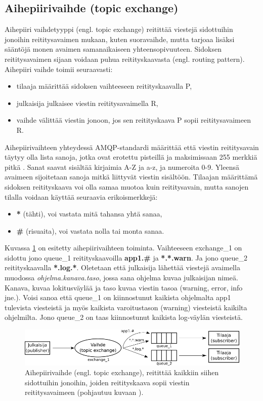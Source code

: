 \subsection{Aihepiirivaihde (topic exchange)}
Aihepiiri vaihdetyyppi (engl. topic exchange) reitittää viestejä sidottuihin jonoihin reititysavaimen mukaan, kuten suoravaihde, mutta tarjoaa lisäksi sääntöjä monen avaimen samanaikaiseen yhteensopivuuteen. Sidoksen reititysavaimen sijaan voidaan puhua reitityskaavasta (engl. routing pattern). Aihepiiri vaihde toimii seuraavasti:
\begin{itemize}
	\item tilaaja määrittää sidoksen vaihteeseen reitityskaavalla P,
	\item julkaisija julkaisee viestin reititysavaimella R,
	\item vaihde välittää viestin jonoon, jos sen reitityskaava P sopii reititysavaimeen R.
\end{itemize}
Aihepiirivaihteen yhteydessä AMQP-standardi määrittää että viestin reititysavain täytyy olla lista sanoja, jotka ovat erotettu pisteillä ja maksimissaan 255 merkkiä pitkä \cite[s.~35]{AMQP-specification}. Sanat saavat sisältää kirjaimia A-Z ja a-z, ja numeroita 0-9. Yleensä avaimeen sijoitetaan sanoja mitkä liittyvät viestin sisältöön. Tilaajan määrittämä sidoksen reitityskaava voi olla samaa muotoa kuin reititysavain, mutta sanojen tilalla voidaan käyttää seuraavia erikoismerkkejä:
\begin{itemize}
	\item \textbf{*} (tähti), voi vastata mitä tahansa yhtä sanaa,
	\item \textbf{\#} (risuaita), voi vastata nolla tai monta sanaa. \cite[s.~27]{AMQP-specification}
\end{itemize}

Kuvassa \ref{fig:amqp-topic-exchange} on esitetty aihepiirivaihteen toiminta. Vaihteeseen exchange\_1 on sidottu jono queue\_1 reitityskaavoilla \textbf{app1.\#} ja \textbf{*.*.warn}. Ja jono queue\_2 reitityskaavalla \textbf{*.log.*}. Oletetaan että julkaisija lähettää viestejä avaimella muodossa \emph{ohjelma.kanava.taso}, jossa sana ohjelma kuvaa julkaisijan nimeä. Kanava, kuvaa lokitusväylää ja taso kuvaa viestin tasoa (warning, error, info jne.). Voisi sanoa että queue\_1 on kiinnostunut kaikista ohjelmalta app1 tulevista viesteistä ja myös kaikista varoitustason (warning) viesteistä kaikilta ohjelmilta. Jono queue\_2 on taas kiinnostunut kaikista log-väylän viesteistä.

\begin{figure}
	\includegraphics[width=1\textwidth]{pictures/amqp-topic-exchange.png}
	\caption{Aihepiirivaihde (engl. topic exchange), reitittää kaikkiin siihen sidottuihin jonoihin, joiden reitityskaava sopii viestin reititysavaimeen (pohjautuu kuvaan \cite{RabbitMQ-Tutorial-Topics}).}
	\label{fig:amqp-topic-exchange}
\end{figure}

